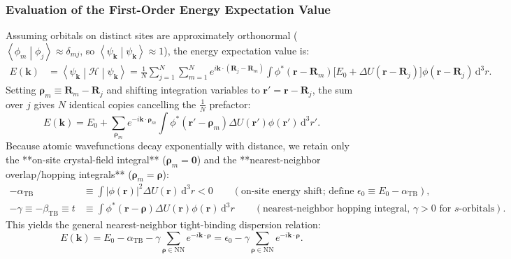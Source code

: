 \documentclass[11pt,a4paper]{article}
\newcommand{\braket}[2]{\left\langle #1 \middle| #2 \right\rangle}
\newcommand{\mel}[3]{\left\langle #1 \middle| #2 \middle| #3 \right\rangle}
\newcommand{\abs}[1]{\left|#1\right|}
\newcommand{\vb}[1]{\mathbf{#1}}
\newcommand{\dd}{\mathrm{d}}
\newcommand{\kk}{\mathbf{k}}
\newcommand{\RR}{\mathbf{R}}
\newcommand{\rvec}{\mathbf{r}}
\begin{document}
\subsubsection{Evaluation of the First-Order Energy Expectation Value}
Assuming orbitals on distinct sites are approximately orthonormal ($\braket{\phi_m}{\phi_j} \approx \delta_{mj}$, so $\braket{\psi_{\kk}}{\psi_{\kk}} \approx 1$), the energy expectation value is:
\begin{align}
    E(\kk) &= \mel{\psi_{\kk}}{\mathcal{H}}{\psi_{\kk}} = \frac{1}{N}\sum_{j=1}^N \sum_{m=1}^N e^{i\kk\cdot(\RR_j - \RR_m)} \int \phi^*(\rvec - \RR_m)\big[E_0 + \Delta U(\rvec - \RR_j)\big]\phi(\rvec - \RR_j)\,\dd^3 r.
\end{align}
Setting $\boldsymbol{\rho}_m \equiv \RR_m - \RR_j$ and shifting integration variables to $\rvec' = \rvec - \RR_j$, the sum over $j$ gives $N$ identical copies cancelling the $\frac{1}{N}$ prefactor:
\begin{equation}
    E(\kk) = E_0 + \sum_{\boldsymbol{\rho}_m} e^{-i\kk\cdot\boldsymbol{\rho}_m} \int \phi^*(\rvec' - \boldsymbol{\rho}_m)\Delta U(\rvec')\phi(\rvec')\,\dd^3 r'.
\end{equation}
Because atomic wavefunctions decay exponentially with distance, we retain only the **on-site crystal-field integral** ($\boldsymbol{\rho}_m = \vb{0}$) and the **nearest-neighbor overlap/hopping integrals** ($\boldsymbol{\rho}_m = \boldsymbol{\rho}$):
\begin{align}
    -\alpha_{\mathrm{TB}} &\equiv \int \abs{\phi(\rvec)}^2 \Delta U(\rvec)\,\dd^3 r < 0 \qquad (\text{on-site energy shift; define } \epsilon_0 \equiv E_0 - \alpha_{\mathrm{TB}}), \\
    -\gamma \equiv -\beta_{\mathrm{TB}} \equiv t &\equiv \int \phi^*(\rvec - \boldsymbol{\rho})\Delta U(\rvec)\phi(\rvec)\,\dd^3 r \qquad (\text{nearest-neighbor hopping integral, } \gamma > 0 \text{ for } s\text{-orbitals}).
\end{align}
This yields the general nearest-neighbor tight-binding dispersion relation:
\begin{equation}
    \boxed{E(\kk) = E_0 - \alpha_{\mathrm{TB}} - \gamma\sum_{\boldsymbol{\rho}\in\mathrm{NN}} e^{-i\kk\cdot\boldsymbol{\rho}} = \epsilon_0 - \gamma\sum_{\boldsymbol{\rho}\in\mathrm{NN}} e^{-i\kk\cdot\boldsymbol{\rho}}.}
    \label{eq:tb_general_master}
\end{equation}
\end{document}
